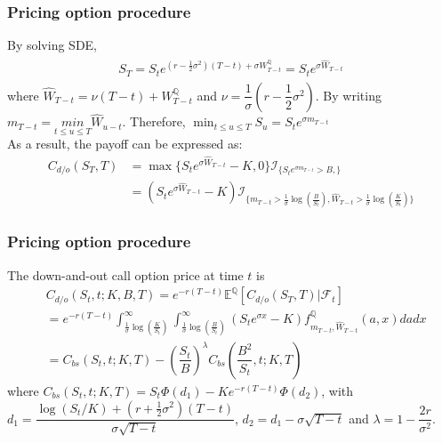 \documentclass{beamer}
\begin{document}
\begin{frame}
\frametitle{Pricing option procedure}
By solving SDE, 
\begin{align}
\begin{split}
S_T=S_te^{\left(r -\frac{1}{2}\sigma^2 \right)(T-t)+\sigma W_{T-t}^\mathbb{Q}}=
S_te^{\sigma \widehat{W}_{T-t}}
\end{split} 
\end{align} 
where $\widehat{W}_{T-t}=\nu (T-t)+W_{T-t}^\mathbb{Q}$ and $\nu=\dfrac{1}{\sigma}(r-\dfrac{1}{2}\sigma^2)$. By writing 
$m_{T-t}=\underset{t\leq u \leq T}  {min}\widehat{W}_{u-t}$.
Therefore, 
$\displaystyle \min_{t\leq u \leq T}S_u=S_te^{\sigma 	m_{T-t}}$\\
As a result, the payoff can be expressed as: 
\begin{align*}
C_{d/o}(S_T,T)&=\max\{S_te^{\sigma \widehat{W}_{T-t}}-K, 0\}\mathcal{I}_{\{S_te^{\sigma 	m_{T-t}} > B, \}}\\
&=(S_te^{\sigma \widehat{W}_{T-t}}-K)\mathcal{I}_{\{m_{T-t}>\frac{1}{\sigma}\log \left(\frac{B}{S_t}\right), \widehat{W}_{T-t}>\frac{1}{\sigma}\log\left(\frac{K}{S_t}\right) \}}
\end{align*}
\end{frame}
\begin{frame}
\frametitle{Pricing option procedure}
The down-and-out call option price at time $t$ is
\begin{align}
&C_{d/o}(S_t,t;K,B,T) = e^{-r(T-t)}\mathbb{E}^\mathbb{Q}\left[C_{d/o}(S_T,T)|\mathcal{F}_t\right]\nonumber\\
&=e^{-r(T-t)}\displaystyle \int_{\frac{1}{\sigma}\log\left(\frac{K}{S_t}\right) }^{\infty}\displaystyle \int_{\frac{1}{\sigma}\log\left(\frac{B}{S_t}\right) }^{\infty}(S_te^{\sigma x}-K)f^\mathbb{Q}_{m_{T-t},\widehat{W}_{T-t}}(a, x)dadx\nonumber\\
&=C_{bs}\left(S_t,t;K,T\right)-\left(\dfrac{S_t}{B}\right)^{\lambda}C_{bs}\left(\dfrac{B^2}{S_t},t;K,T\right)
\end{align}
where 
$
C_{bs}(S_t,t;K,T)=S_t\Phi(d_1)-Ke^{-r(T-t)}\Phi(d_2)$, with
$d_1=\dfrac{\log(S_t/K)+(r+\frac{1}{2}\sigma^2)(T-t)}{\sigma\sqrt{T-t}}$,
$d_2=d_1-\sigma\sqrt{T-t}$ and  $\lambda = 1-\dfrac{2r}{\sigma^2}$.
\end{frame}
\end{document}
